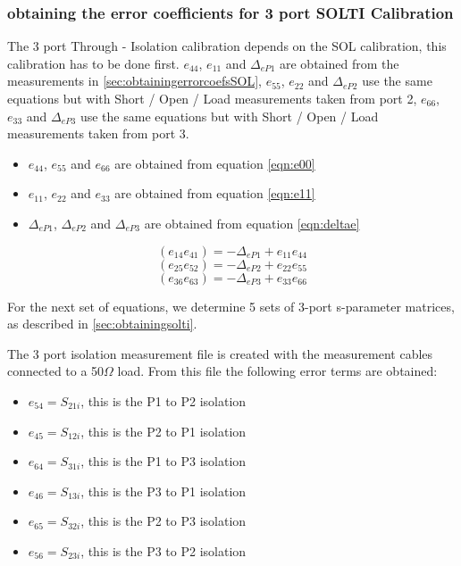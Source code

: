 \subsubsection{obtaining the error coefficients for 3 port SOLTI Calibration}
\label{sec:obtaining3psolti}
The 3 port Through - Isolation calibration depends on the SOL calibration, this calibration has to be done first. 
$e_{44}$, $e_{11}$ and $\Delta_{eP1}$ are obtained from the measurements in \ref{sec:obtainingerrorcoefsSOL}, $e_{55}$, $e_{22}$ and $\Delta_{eP2}$ use the same equations but with Short / Open / Load measurements taken from port 2, $e_{66}$, $e_{33}$ and $\Delta_{eP3}$ use the same equations but with Short / Open / Load measurements taken from port 3. 
\begin{itemize}
	\item {$e_{44}$, $e_{55}$ and $e_{66}$ are obtained from equation \ref{eqn:e00}}
	\item {$e_{11}$, $e_{22}$ and $e_{33}$ are obtained from equation \ref{eqn:e11}}	
	\item {$\Delta_{eP1}$, $\Delta_{eP2}$ and $\Delta_{eP3}$ are obtained from equation \ref{eqn:deltae}}
\end{itemize}

\begin{equation}
(e_{14}e_{41}) = -\Delta_{eP1}+e_{11}e_{44}
\end{equation}
\begin{equation}
(e_{25}e_{52}) = -\Delta_{eP2}+e_{22}e_{55}
\end{equation}
\begin{equation}
(e_{36}e_{63}) = -\Delta_{eP3}+e_{33}e_{66}
\end{equation}

For the next set of equations, we determine 5 sets of 3-port s-parameter matrices, as described in \ref{sec:obtainingsolti}.

The 3 port isolation measurement file is created with the measurement cables connected to a 50$\Omega$ load. From this file the following error terms are obtained:
\begin{itemize}
	\item $e_{54} = S_{21i}$, this is the P1 to P2 isolation
	\item $e_{45} = S_{12i}$, this is the P2 to P1 isolation
	\item $e_{64} = S_{31i}$, this is the P1 to P3 isolation
	\item $e_{46} = S_{13i}$, this is the P3 to P1 isolation
	\item $e_{65} = S_{32i}$, this is the P2 to P3 isolation
	\item $e_{56} = S_{23i}$, this is the P3 to P2 isolation
\end{itemize}



